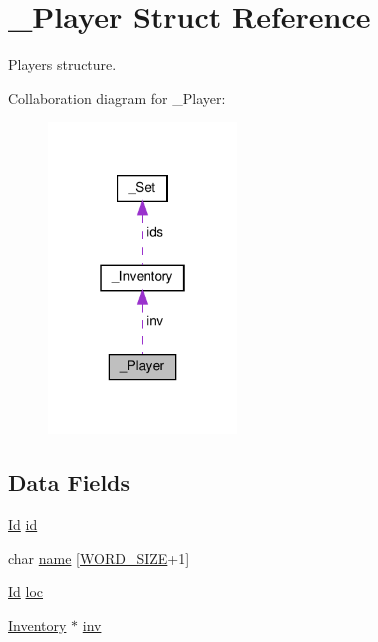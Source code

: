 \hypertarget{struct__Player}{}\section{\+\_\+\+Player Struct Reference}
\label{struct__Player}


Player\textquotesingle{}s structure.  




Collaboration diagram for \+\_\+\+Player\+:
\nopagebreak
\begin{figure}[H]
\begin{center}
\leavevmode
\includegraphics[width=142pt]{struct__Player__coll__graph}
\end{center}
\end{figure}
\subsection*{Data Fields}
\begin{DoxyCompactItemize}
\item 
\hyperlink{types_8h_a845e604fb28f7e3d97549da3448149d3}{Id} \hyperlink{struct__Player_a60d635cd063816a9c1bd873f4868bb90}{id}
\item 
char \hyperlink{struct__Player_ac89715f913cc607b75eb7236765c41f5}{name} \mbox{[}\hyperlink{types_8h_a92ed8507d1cd2331ad09275c5c4c1c89}{W\+O\+R\+D\+\_\+\+S\+I\+ZE}+1\mbox{]}
\item 
\hyperlink{types_8h_a845e604fb28f7e3d97549da3448149d3}{Id} \hyperlink{struct__Player_a40f39335ccf0d2de882b7588f1917e58}{loc}
\item 
\hyperlink{struct__Inventory}{Inventory} $\ast$ \hyperlink{struct__Player_aaaeeb03326c37ce62c333c2b94fde23c}{inv}
\end{DoxyCompactItemize}


